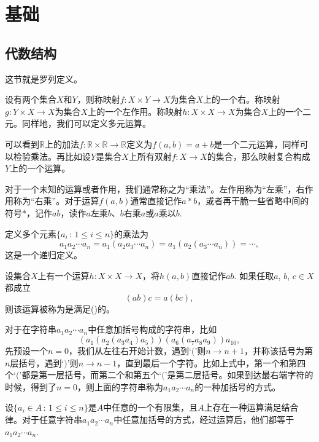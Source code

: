 \chapter{基础}

\section{代数结构}

这节就是罗列定义。

\para 设有两个集合$X$和$Y$，则称映射$f:X\times Y \to X$为集合$X$上的一个右。称映射$g:Y\times X \to X$为集合$X$上的一个左作用。称映射$h:X\times X \to X$为集合$X$上的一个二元。同样地，我们可以定义多元运算。

可以看到$\mathbb{R}$上的加法$f:\mathbb{R}\times \mathbb{R} \to \mathbb{R}$定义为$f(a,b)=a+b$是一个二元运算，同样可以检验乘法。再比如设$Y$是集合$X$上所有双射$f:X\to X$的集合，那么映射复合构成$Y$上的一个运算。

对于一个未知的运算或者作用，我们通常称之为“乘法”。左作用称为“左乘”，右作用称为“右乘”。对于运算$f(a,b)$通常直接记作$a*b$，或者再干脆一些省略中间的符号$*$，记作$ab$，读作$a$左乘$b$、$b$右乘$a$或$a$乘以$b$.

定义多个元素$\{a_i\,:\, 1\leq i \leq n\}$的乘法为
\[
	a_1a_2\cdots a_n=a_1(a_2a_3\cdots a_n)=a_1(a_2(a_3\cdots a_n))=\cdots,
\]
这是一个递归定义。

\para 设集合$X$上有一个运算$h:X\times X \to X$，将$h(a,b)$直接记作$ab$. 如果任取$a$, $b$, $c\in X$都成立
\[
	(ab)c=a(bc),
\]
则该运算被称为是满足()的。

\para 对于在字符串$a_1a_2\cdots a_n$中任意加括号构成的字符串，比如
\[
(a_1(a_2(a_3a_4)a_5))(a_6(a_7a_8a_9))a_{10},
\]
先预设一个$n=0$，我们从左往右开始计数，遇到`$($'则$n\to n+1$，并称该括号为第$n$层括号，遇到`$)$'则$n\to n-1$，直到最后一个字符。比如上式中，第一个和第四个`$($'都是第一层括号，而第二个和第五个`$($'是第二层括号。如果到达最右端字符的时候，得到了$n=0$，则上面的字符串称为$a_1a_2\cdots a_n$的一种加括号的方式。

\begin{pro}
设$\{a_i\in A\,:\, 1\leq i\leq n\}$是$A$中任意的一个有限集，且$A$上存在一种运算满足结合律。对于任意字符串$a_1a_2\cdots a_n$中任意加括号的方式，经过运算后，他们都等于$a_1a_2\cdots a_n$.
\end{pro}

